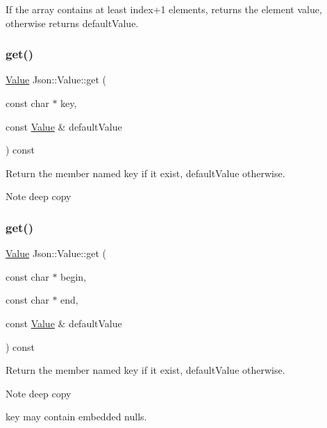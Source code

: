 If the array contains at least index+1 elements, returns the element value, otherwise returns default\+Value. \mbox{\label{classJson_1_1Value_a57de86629ed23246f14014fb6c44fa67}} 
\subsubsection{\texorpdfstring{get()}{get()}\hspace{0.1cm}{\footnotesize\ttfamily [2/4]}}
{\footnotesize\ttfamily \hyperlink{classJson_1_1Value}{Value} Json\+::\+Value\+::get (\begin{DoxyParamCaption}\item[{const char $\ast$}]{key,  }\item[{const \hyperlink{classJson_1_1Value}{Value} \&}]{default\+Value }\end{DoxyParamCaption}) const}

Return the member named key if it exist, default\+Value otherwise. \begin{DoxyNote}{Note}
deep copy 
\end{DoxyNote}
\mbox{\label{classJson_1_1Value_aa59ed050e87e1d58d93671a38687f36c}} 
\subsubsection{\texorpdfstring{get()}{get()}\hspace{0.1cm}{\footnotesize\ttfamily [3/4]}}
{\footnotesize\ttfamily \hyperlink{classJson_1_1Value}{Value} Json\+::\+Value\+::get (\begin{DoxyParamCaption}\item[{const char $\ast$}]{begin,  }\item[{const char $\ast$}]{end,  }\item[{const \hyperlink{classJson_1_1Value}{Value} \&}]{default\+Value }\end{DoxyParamCaption}) const}

Return the member named key if it exist, default\+Value otherwise. \begin{DoxyNote}{Note}
deep copy 

key may contain embedded nulls. 
\end{DoxyNote}
\mbox{\label{classJson_1_1Value_a7406e6af727c288bf8ab59945ece686a}} 

